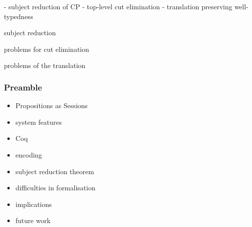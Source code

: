 \documentclass{beamer}
\begin{document}
\begin{comment}
the translation to CP is
presented. blah blah something about the session types being a little odd or
overlook this probably
\end{comment}

\begin{frame}
- subject reduction of CP
- top-level cut elimination
- translation preserving well-typedness
\end{frame}

\begin{comment}
the system has three main properties. subject reduction of CP, top-level
cut-elimination and translation preserving well-typedness. of which subject
reduction is the only one fully formalised. the other two presented some
challenges but some comments on progress towards the other two is
offered. i also highlight some issues and guidelines
\end{comment}

\begin{frame}
subject reduction
\end{frame}

\begin{comment}
subject reduction is formalised using a relation on processes
\end{comment}

\begin{frame}
problems for cut elimination
\end{frame}

\begin{comment}
sessions correspond to propositions
processes correspond to proofs
cut elimination corresponds to communication

cut elimination is not currently proven since we require a termination measure
on the length of a derivation and a relationship between the subprocesses of a
cut. other work based on formalising logics where the derivations are explicit
may be inspirational
\end{comment}

\begin{frame}
problems of the translation
\end{frame}

\begin{comment}
the translation seems to require a duplication of the specifications for cp
and gv typing rules not done

what can we show them for the failures?

here are some issues and things learnt! -- our guidelines are all about
modularisation, representation, library reuse, automation!
\end{comment}

\begin{frame}
\frametitle{Preamble}
\begin{itemize}
\item Propositions as Sessions
\item system features
\item Coq
\item encoding
\item subject reduction theorem
\item difficulties in formalisation
\item implications
\item future work
\end{itemize}
\end{frame}

\printbibliography
\end{document}
